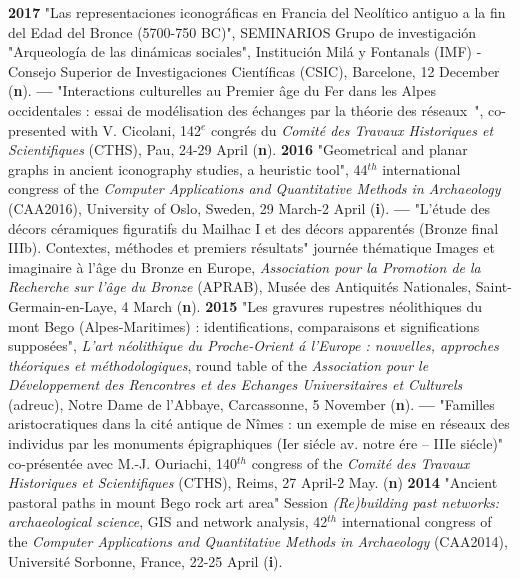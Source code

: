 \documentclass{article}
\begin{document}
\smallbreak
\textbf{2017 }"Las representaciones iconogr\'{a}ficas en Francia del Neol\'{i}tico antiguo a la fin del Edad del Bronce (5700-750 BC)", SEMINARIOS Grupo de investigaci\'{o}n "Arqueolog\'{i}a de las din\'{a}micas sociales", Instituci\'{o}n Mil\'{a} y Fontanals (IMF) - Consejo Superior de Investigaciones Cient\'{i}ficas (CSIC), Barcelone, 12 December (\textbf{n}).
\smallbreak
\textbf{--- } "Interactions culturelles au Premier \^{a}ge du Fer dans les Alpes occidentales : essai de mod\'{e}lisation des \'{e}changes par la th\'{e}orie des r\'{e}seaux~", co-presented with V. Cicolani, 142${}^{e}$ congr\'{e}s du \textit{Comit\'{e} des Travaux Historiques et Scientifiques} (CTHS), Pau, 24-29 April (\textbf{n}).
\smallbreak
\textbf{2016 }"Geometrical and planar graphs in ancient iconography studies, a heuristic tool", 44${}^{th}$ international congress of the \textit{Computer Applications and Quantitative Methods in Archaeology} (CAA2016), University of Oslo, Sweden, 29 March-2 April (\textbf{i}).
\smallbreak
\textbf{--- }"L'\'{e}tude des d\'{e}cors c\'{e}ramiques figuratifs du Mailhac I et des d\'{e}cors apparent\'{e}s (Bronze final IIIb). Contextes, m\'{e}thodes et premiers r\'{e}sultats" journ\'{e}e th\'{e}matique Images et imaginaire \`{a} l'\^{a}ge du Bronze en Europe, \textit{Association pour la Promotion de la Recherche sur l'\^{a}ge du Bronze} (APRAB), Mus\'{e}e des Antiquit\'{e}s Nationales, Saint-Germain-en-Laye, 4 March (\textbf{n}).
\smallbreak
\textbf{2015 }"Les gravures rupestres n\'{e}olithiques du mont Bego (Alpes-Maritimes) : identifications, comparaisons et significations suppos\'{e}es", \textit{L'art n\'{e}olithique du Proche-Orient \'{a} l'Europe : nouvelles, approches th\'{e}oriques et m\'{e}thodologiques}, round table of the \textit{Association pour le D\'{e}veloppement des Rencontres et des Echanges Universitaires et Culturels} (adreuc), Notre Dame de l'Abbaye, Carcassonne, 5 November (\textbf{n}).
\smallbreak
\textbf{--- }"Familles aristocratiques dans la cit\'{e} antique de N\^{i}mes : un exemple de mise en r\'{e}seaux des individus par les monuments \'{e}pigraphiques (Ier si\'{e}cle av. notre \'{e}re -- IIIe si\'{e}cle)" co-pr\'{e}sent\'{e}e avec M.-J. Ouriachi, 140${}^{th}$ congress of the \textit{Comit\'{e} des Travaux Historiques et Scientifiques} (CTHS), Reims, 27 April-2 May. (\textbf{n})
\smallbreak
\textbf{2014 }"Ancient pastoral paths in mount Bego rock art area" Session \textit{(Re)building past networks: archaeological science}, GIS and network analysis, 42${}^{th}$ international congress of the \textit{Computer Applications and Quantitative Methods in Archaeology} (CAA2014), Universit\'{e} Sorbonne, France, 22-25 April (\textbf{i}).
\end{document}
